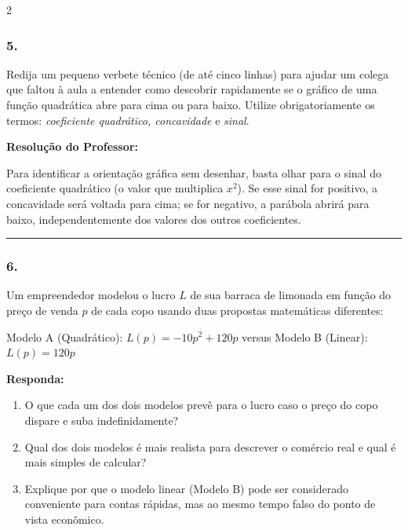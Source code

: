 \begin{multicols*}{2}
\subsubsection*{5.} Redija um pequeno verbete técnico (de até cinco linhas) para ajudar um colega que faltou à aula a entender como descobrir rapidamente se o gráfico de uma função quadrática abre para cima ou para baixo. Utilize obrigatoriamente os termos: \textit{coeficiente quadrático, concavidade} e \textit{sinal}.

\ifgabarito
    \begin{tcolorbox}[colback=CorTitUm!5, colframe=CorTitUm, boxrule=1pt, arc=4pt, left=6pt, right=6pt, top=6pt, bottom=6pt]
    \small\textbf{\textcolor{CorTitUm}{Resolução do Professor:}}\par\vspace{0.1cm}
    \color{CinzaEscuro}
    Para identificar a orientação gráfica sem desenhar, basta olhar para o sinal do coeficiente quadrático (o valor que multiplica $x^2$). Se esse sinal for positivo, a concavidade será voltada para cima; se for negativo, a parábola abrirá para baixo, independentemente dos valores dos outros coeficientes.
    \end{tcolorbox}
\fi

\par\vspace{\espacoQuestao}

\noindent\textcolor{CorLinha}{\rule{\linewidth}{0.5pt}} 
\par\vspace{\espacoPreQuestao}
\subsubsection*{6.} Um empreendedor modelou o lucro $L$ de sua barraca de limonada em função do preço de venda $p$ de cada copo usando duas propostas matemáticas diferentes:
\begin{center}
Modelo A (Quadrático): $L(p) = -10p^2 + 120p$ \quad versus \quad Modelo B (Linear): $L(p) = 120p$
\end{center}

\begin{boxresponda}
\textbf{Responda:} 
\begin{enumerate}[label=\alph*), itemsep=\espacoAlt]
\item O que cada um dos dois modelos prevê para o lucro caso o preço do copo dispare e suba indefinidamente?
\item Qual dos dois modelos é mais realista para descrever o comércio real e qual é mais simples de calcular?
\item Explique por que o modelo linear (Modelo B) pode ser considerado conveniente para contas rápidas, mas ao mesmo tempo falso do ponto de vista econômico.
\end{enumerate}
\end{boxresponda}


\end{multicols*}
